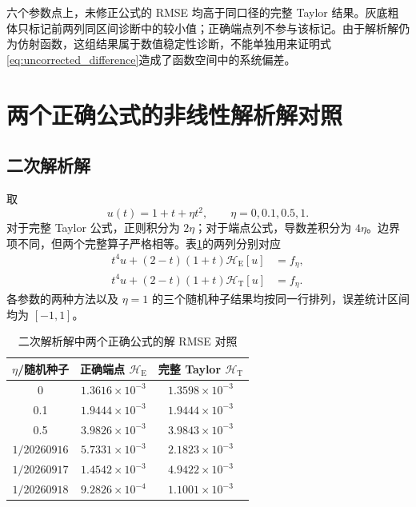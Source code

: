 \documentclass[UTF8,fontset=none,11pt,a4paper]{ctexart}
\newcommand{\best}[1]{\cellcolor{gray!15}\textbf{#1}}
\begin{document}
六个参数点上，未修正公式的 RMSE 均高于同口径的完整 Taylor 结果。灰底粗体只标记前两列同区间诊断中的较小值；正确端点列不参与该标记。由于解析解仍为仿射函数，这组结果属于数值稳定性诊断，不能单独用来证明式\eqref{eq:uncorrected_difference}造成了函数空间中的系统偏差。

\section{两个正确公式的非线性解析解对照}

\subsection{二次解析解}

取
\begin{equation}
u(t)=1+t+\eta t^2,
\qquad \eta=0,0.1,0.5,1.
\end{equation}
对于完整 Taylor 公式，正则积分为 $2\eta$；对于端点公式，导数差积分为 $4\eta$。边界项不同，但两个完整算子严格相等。表\ref{tab:quadratic_results}的两列分别对应
\begin{equation*}
\begin{aligned}
t^4u+(2-t)(1+t)\mathcal H_{\mathrm E}[u]&=f_\eta,\\
t^4u+(2-t)(1+t)\mathcal H_{\mathrm T}[u]&=f_\eta.
\end{aligned}
\end{equation*}
各参数的两种方法以及 $\eta=1$ 的三个随机种子结果均按同一行排列，误差统计区间均为 $[-1,1]$。

\begin{table}[H]
\centering
\caption{二次解析解中两个正确公式的解 RMSE 对照}
\label{tab:quadratic_results}
\begin{tabular}{ccc}
\toprule
$\eta$/随机种子 & 正确端点 $\mathcal H_{\mathrm E}$ & 完整 Taylor $\mathcal H_{\mathrm T}$\\
\midrule
0 & $1.3616\times10^{-3}$ & \best{$1.3598\times10^{-3}$}\\
0.1 & $1.9444\times10^{-3}$ & $1.9444\times10^{-3}$\\
0.5 & \best{$3.9826\times10^{-3}$} & $3.9843\times10^{-3}$\\
$1/20260916$ & $5.7331\times10^{-3}$ & \best{$2.1823\times10^{-3}$}\\
$1/20260917$ & \best{$1.4542\times10^{-3}$} & $4.9422\times10^{-3}$\\
$1/20260918$ & \best{$9.2826\times10^{-4}$} & $1.1001\times10^{-3}$\\
\bottomrule
\end{tabular}
\end{table}
\end{document}
